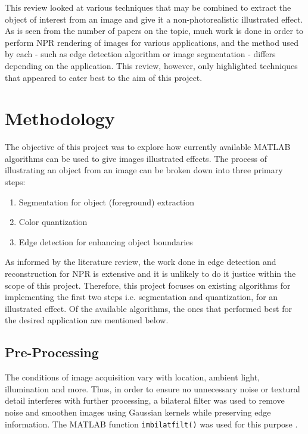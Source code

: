 \documentclass{article}
\begin{document}
This review looked at various techniques that may be combined to extract the object of interest from an image and give it a non-photorealistic illustrated effect. As is seen from the number of papers on the topic, much work is done in order to perform NPR rendering of images for various applications, and the method used by each - such as edge detection algorithm or image segmentation - differs depending on the application. This review, however, only highlighted techniques that appeared to cater best to the aim of this project. 

\section{Methodology}
\label{sec:methodology}
The objective of this project was to explore how currently available MATLAB algorithms can be used to give images illustrated effects. The process of illustrating an object from an image can be broken down into three primary steps:
\begin{enumerate}
  \item Segmentation for object (foreground) extraction
  \item Color quantization 
  \item Edge detection for enhancing object boundaries
\end{enumerate}
As informed by the literature review, the work done in edge detection and reconstruction for NPR is extensive and it is unlikely to do it justice within the scope of this project. Therefore, this project focuses on existing algorithms for implementing the first two steps i.e. segmentation and quantization, for an illustrated effect. Of the available algorithms, the ones that performed best for the desired application are mentioned below.

\subsection{Pre-Processing}
\label{sec:preprocessing}
The conditions of image acquisition vary with location, ambient light, illumination and more. Thus, in order to ensure no unnecessary noise or textural detail interferes with further processing, a bilateral filter was used to remove noise and smoothen images using Gaussian kernels \cite{tomasi_bilateral_1998} while preserving edge information. The MATLAB function \texttt{imbilatfilt()} was used for this purpose \cite{noauthor_bilateral_nodate}.
\end{document}
